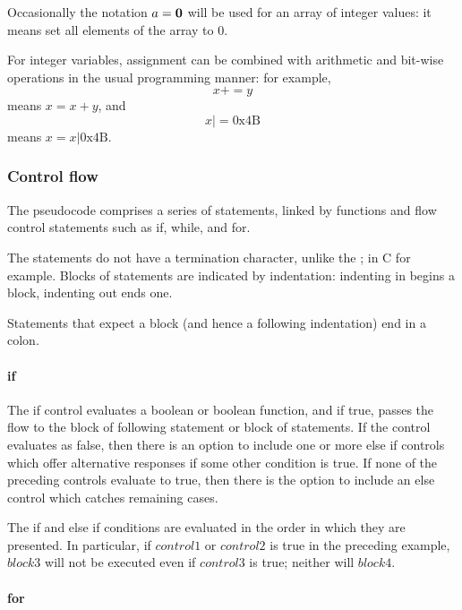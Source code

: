 Occasionally the notation $a={\bf 0}$ will be used for an array of integer values:
it means set all elements of the array to 0.

For integer variables, assignment can be combined with arithmetic and bit-wise
operations in the usual programming manner: for example, 
\[x+=y\]
means $x=x+y$, and
\[x |= \text{0x4B}\]
means $x=x|\text{0x4B}$.

\subsubsection{Control flow}
\label{controlflow}

The pseudocode comprises a series of statements, linked by functions and
flow control statements such as if, while, and for.

The statements do not have a termination character, unlike the ; in C
for example.  Blocks of statements are indicated by indentation:
indenting in begins a block, indenting out ends one.

Statements that expect a block (and hence a following indentation) end
in a colon.

\paragraph*{if}

The if control evaluates a boolean or boolean function, and if true, passes the 
flow to the block of following statement or block of statements. If the control
evaluates as false, then there is an option to include one or more else if
controls which offer alternative responses if some other condition is
true.  If none of the preceding controls evaluate to true, then there is
the option to include an else control which catches remaining cases.

\begin{pseudo*}
\bsELSE
\bsEND
\end{pseudo*}

The if and else if conditions are evaluated in the order in which they
are presented. In particular, if $control1$ or $control2$ is true in
the preceding example, $block3$ will not be executed
even if $control3$ is true; neither will $block4$.

\paragraph*{for}

